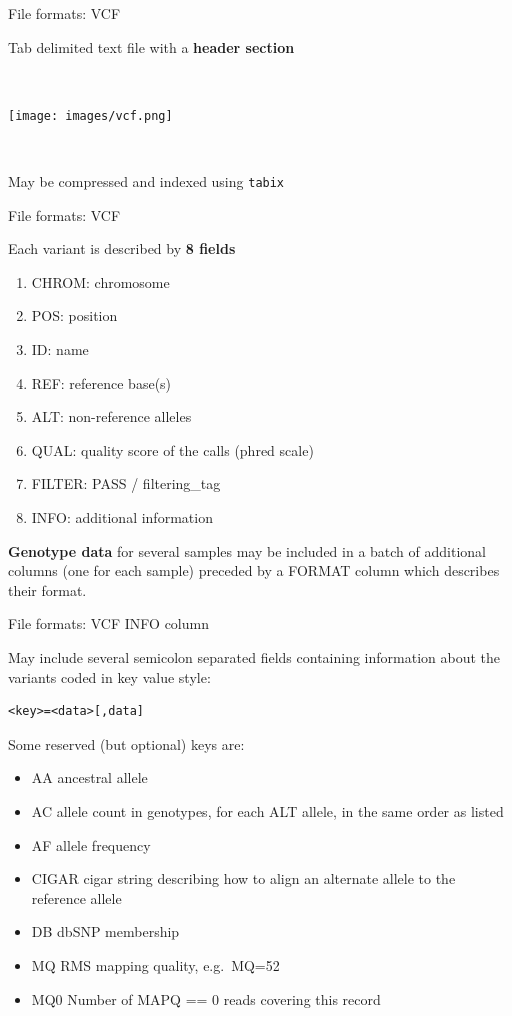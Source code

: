 \begin{frame}{File formats: VCF}

Tab delimited text file with a \textbf{header section}

~

\centerline{\texttt{[image: images/vcf.png]}}

~

May be compressed and indexed using \texttt{tabix}

\end{frame}

\begin{frame}{File formats: VCF}

Each variant is described by \textbf{8 fields}

\begin{enumerate}
\def\labelenumi{\arabic{enumi}.}
\item
  CHROM: chromosome
\item
  POS: position
\item
  ID: name
\item
  REF: reference base(s)
\item
  ALT: non-reference alleles
\item
  QUAL: quality score of the calls (phred scale)
\item
  FILTER: PASS / filtering\_tag
\item
  INFO: additional information
\end{enumerate}

\textbf{Genotype data} for several samples may be included in a batch of
additional columns (one for each sample) preceded by a FORMAT column
which describes their format.

\end{frame}

\begin{frame}[fragile]{File formats: VCF INFO column}

May include several semicolon separated fields containing information
about the variants coded in key value style:

\begin{verbatim}
<key>=<data>[,data]
\end{verbatim}

Some reserved (but optional) keys are:

\begin{itemize}
\itemsep1pt\parskip0pt
\item
  AA ancestral allele
\item
  AC allele count in genotypes, for each ALT allele, in the same order
  as listed
\item
  AF allele frequency
\item
  CIGAR cigar string describing how to align an alternate allele to the
  reference allele
\item
  DB dbSNP membership
\item
  MQ RMS mapping quality, e.g.~MQ=52
\item
  MQ0 Number of MAPQ == 0 reads covering this record
\end{itemize}

\end{frame}

